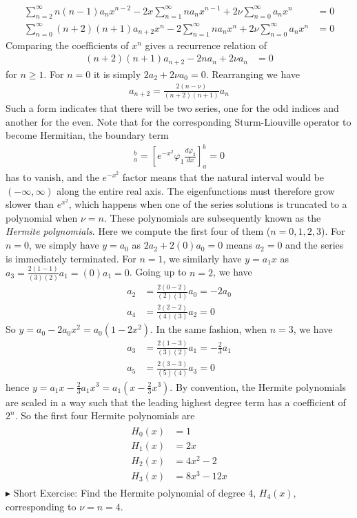 \begin{solution}
\begin{align}
\sum_{n=2}^{\infty} n(n-1) a_nx^{n-2} - 2x\sum_{n=1}^{\infty} n a_nx^{n-1} + 2\nu \sum_{n=0}^{\infty} a_n x^n &= 0 \nonumber \\
\sum_{n=0}^{\infty} (n+2)(n+1) a_{n+2}x^{n} - 2\sum_{n=1}^{\infty} n a_nx^{n} + 2\nu \sum_{n=0}^{\infty} a_n x^n &= 0 
\end{align}
Comparing the coefficients of $x^n$ gives a recurrence relation of
\begin{align}
(n+2)(n+1)a_{n+2} - 2n a_n + 2\nu a_n &= 0
\end{align}
for $n \geq 1$. For $n=0$ it is simply $2a_2 + 2\nu a_0 = 0$. Rearranging we have
\begin{align}
a_{n+2} = \frac{2(n-\nu)}{(n+2)(n+1)}a_n
\end{align}
Such a form indicates that there will be two series, one for the odd indices and another for the even. Note that for the corresponding Sturm-Liouville operator to become Hermitian, the boundary term
\begin{align*}
[\varphi_1 p(x) \frac{d\overline{\varphi_2}}{dx}]_a^b = [e^{-x^2} \varphi_1 \frac{d\overline{\varphi_2}}{dx}]_a^b = 0
\end{align*}
has to vanish, and the $e^{-x^2}$ factor means that the natural interval would be $(-\infty, \infty)$ along the entire real axis. The eigenfunctions must therefore grow slower than $e^{x^2}$, which happens when one of the series solutions is truncated to a polynomial when $\nu = n$. These polynomials are subsequently known as the \textit{Hermite polynomials}. Here we compute the first four of them ($n=0,1,2,3$). For $n=0$, we simply have $y = a_0$ as $2a_2 + 2(0)a_0 = 0$ means $a_2 = 0$ and the series is immediately terminated. For $n=1$, we similarly have $y = a_1x$ as $a_3 = \frac{2(1-1)}{(3)(2)}a_1 = (0)a_1 = 0$. Going up to $n=2$, we have
\begin{align*}
a_2 &= \frac{2(0-2)}{(2)(1)}a_0 = -2a_0 \\
a_4 &= \frac{2(2-2)}{(4)(3)}a_2 = 0
\end{align*}
So $y = a_0 - 2a_0 x^2 = a_0(1-2x^2)$. In the same fashion, when $n=3$, we have
\begin{align*}
a_3 &= \frac{2(1-3)}{(3)(2)}a_1 = -\frac{2}{3}a_1 \\
a_5 &= \frac{2(3-3)}{(5)(4)}a_3 = 0
\end{align*}
hence $y = a_1x - \frac{2}{3}a_1x^3 = a_1(x-\frac{2}{3}x^3)$. By convention, the Hermite polynomials are scaled in a way such that the leading highest degree term has a coefficient of $2^n$. So the first four Hermite polynomials are
\begin{align}
\begin{aligned}
H_0(x) &= 1 \\
H_1(x) &= 2x \\
H_2(x) &= 4x^2 - 2 \\
H_3(x) &= 8x^3 - 12x
\end{aligned}
\end{align}    
$\blacktriangleright$ Short Exercise: Find the Hermite polynomial of degree $4$, $H_4(x)$, corresponding to $\nu = n = 4$.\footnotemark
\end{solution}

